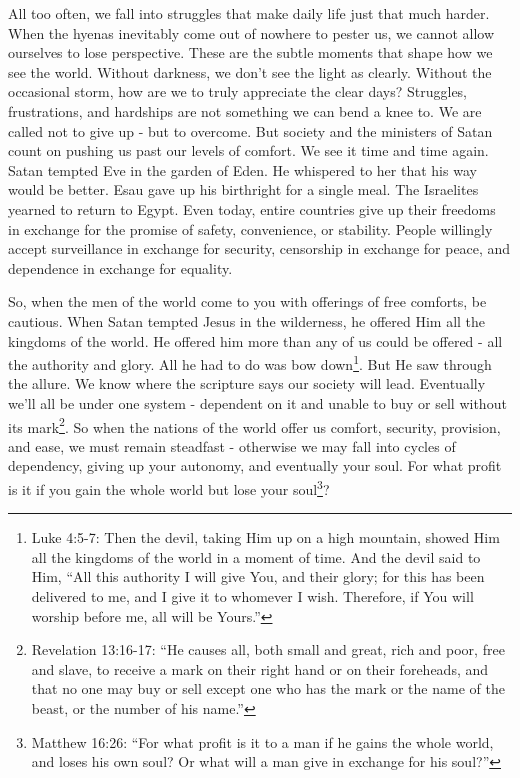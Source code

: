 \documentclass[10pt]{article}
\begin{document}
\begin{multicols}{2}
All too often, we fall into struggles that make daily life just that much harder. When the hyenas inevitably come out of nowhere to pester us, we cannot allow ourselves to lose perspective. These are the subtle moments that shape how we see the world. Without darkness, we don't see the light as clearly. Without the occasional storm, how are we to truly appreciate the clear days? Struggles, frustrations, and hardships are not something we can bend a knee to. We are called not to give up - but to overcome. But society and the ministers of Satan count on pushing us past our levels of comfort. We see it time and time again. Satan tempted Eve in the garden of Eden. He whispered to her that his way would be better. Esau gave up his birthright for a single meal. The Israelites yearned to return to Egypt. Even today, entire countries give up their freedoms in exchange for the promise of safety, convenience, or stability. People willingly accept surveillance in exchange for security, censorship in exchange for peace, and dependence in exchange for equality.

So, when the men of the world come to you with offerings of free comforts, be cautious. When Satan tempted Jesus in the wilderness, he offered Him all the kingdoms of the world. He offered him more than any of us could be offered - all the authority and glory. All he had to do was bow down\footnote{Luke 4:5-7: Then the devil, taking Him up on a high mountain, showed Him all the kingdoms of the world in a moment of time. And the devil said to Him, ``All this authority I will give You, and their glory; for this has been delivered to me, and I give it to whomever I wish. Therefore, if You will worship before me, all will be Yours.''}. But He saw through the allure. We know where the scripture says our society will lead. Eventually we'll all be under one system - dependent on it and unable to buy or sell without its mark\footnote{Revelation 13:16-17: ``He causes all, both small and great, rich and poor, free and slave, to receive a mark on their right hand or on their foreheads, and that no one may buy or sell except one who has the mark or the name of the beast, or the number of his name.''}. So when the nations of the world offer us comfort, security, provision, and ease, we must remain steadfast - otherwise we may fall into cycles of dependency, giving up your autonomy, and eventually your soul. For what profit is it if you gain the whole world but lose your soul\footnote{Matthew 16:26: ``For what profit is it to a man if he gains the whole world, and loses his own soul? Or what will a man give in exchange for his soul?''}?


\end{multicols}
\end{document}
